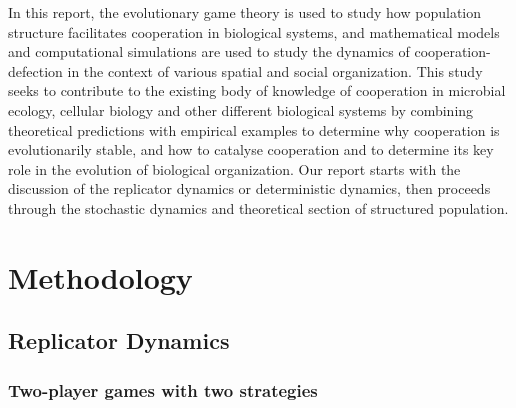 \documentclass{article}
\begin{document}
In this report, the evolutionary game theory is used to study how population structure facilitates cooperation in biological systems, and mathematical models and computational simulations are used to study the dynamics of cooperation-defection in the context of various spatial and social organization. This study seeks to contribute to the existing body of knowledge of cooperation in microbial ecology, cellular biology and other different biological systems by combining theoretical predictions with empirical examples to determine why cooperation is evolutionarily stable, and how to catalyse cooperation and to determine its key role in the evolution of biological organization.
Our report starts with the discussion of the replicator dynamics or deterministic  dynamics, then proceeds through the stochastic dynamics and theoretical section of structured population.

\section{Methodology}
\subsection{Replicator Dynamics}
\label{subsec:Replicator Dynamics}
\subsubsection{Two-player games with two strategies}
\label{subsubsec:Two-player games with two strategies}
\end{document}
